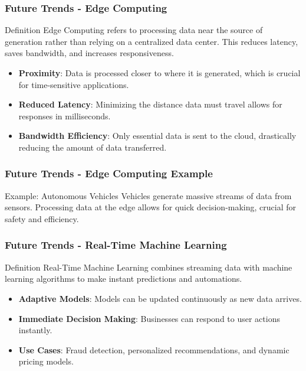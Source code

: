 \documentclass[aspectratio=169]{beamer}
\begin{document}
\begin{frame}[fragile]
    \frametitle{Future Trends - Edge Computing}
    \begin{block}{Definition}
        Edge Computing refers to processing data near the source of generation rather than relying on a centralized data center. 
        This reduces latency, saves bandwidth, and increases responsiveness.
    \end{block}
    
    \begin{itemize}
        \item \textbf{Proximity}: Data is processed closer to where it is generated, which is crucial for time-sensitive applications.
        \item \textbf{Reduced Latency}: Minimizing the distance data must travel allows for responses in milliseconds.
        \item \textbf{Bandwidth Efficiency}: Only essential data is sent to the cloud, drastically reducing the amount of data transferred.
    \end{itemize}
\end{frame}

\begin{frame}[fragile]
    \frametitle{Future Trends - Edge Computing Example}
    \begin{block}{Example: Autonomous Vehicles}
        Vehicles generate massive streams of data from sensors. 
        Processing data at the edge allows for quick decision-making, crucial for safety and efficiency.
    \end{block}
\end{frame}

\begin{frame}[fragile]
    \frametitle{Future Trends - Real-Time Machine Learning}
    \begin{block}{Definition}
        Real-Time Machine Learning combines streaming data with machine learning algorithms to make instant predictions and automations.
    \end{block}

    \begin{itemize}
        \item \textbf{Adaptive Models}: Models can be updated continuously as new data arrives.
        \item \textbf{Immediate Decision Making}: Businesses can respond to user actions instantly.
        \item \textbf{Use Cases}: Fraud detection, personalized recommendations, and dynamic pricing models.
    \end{itemize}
\end{frame}
\end{document}
